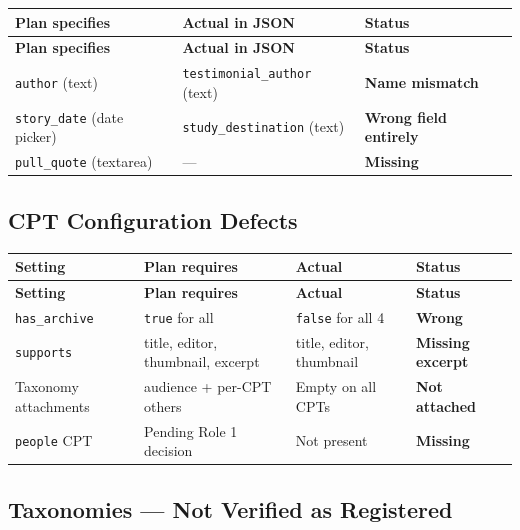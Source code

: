\documentclass[12pt,a4paper]{article}
\begin{document}
\vspace{0.4em}
\begin{longtable}{@{}p{4cm}p{4.2cm}p{4.1cm}@{}}
\toprule
\rowcolor{uvtLightBlue}
\textbf{Plan specifies} & \textbf{Actual in JSON} & \textbf{Status} \\
\midrule
\endfirsthead
\toprule
\rowcolor{uvtLightBlue}
\textbf{Plan specifies} & \textbf{Actual in JSON} & \textbf{Status} \\
\midrule
\endhead
\bottomrule
\endfoot
\texttt{author} (text) & \texttt{testimonial\_author} (text) & \textcolor{statusRed}{\textbf{Name mismatch}} \\
\texttt{story\_date} (date picker) & \texttt{study\_destination} (text) & \textcolor{statusRed}{\textbf{Wrong field entirely}} \\
\texttt{pull\_quote} (textarea) & --- & \textcolor{statusRed}{\textbf{Missing}} \\
\end{longtable}

\subsection{CPT Configuration Defects}

\begin{longtable}{@{}p{3.2cm}p{3.5cm}p{3.5cm}p{2.1cm}@{}}
\toprule
\rowcolor{uvtLightBlue}
\textbf{Setting} & \textbf{Plan requires} & \textbf{Actual} & \textbf{Status} \\
\midrule
\endfirsthead
\toprule
\rowcolor{uvtLightBlue}
\textbf{Setting} & \textbf{Plan requires} & \textbf{Actual} & \textbf{Status} \\
\midrule
\endhead
\bottomrule
\endfoot
\texttt{has\_archive} & \texttt{true} for all & \texttt{false} for all 4 & \textcolor{statusRed}{\textbf{Wrong}} \\
\texttt{supports} & title, editor, thumbnail, excerpt & title, editor, thumbnail & \textcolor{statusRed}{\textbf{Missing excerpt}} \\
Taxonomy attachments & audience + per-CPT others & Empty on all CPTs & \textcolor{statusRed}{\textbf{Not attached}} \\
\texttt{people} CPT & Pending Role 1 decision & Not present & \textcolor{statusRed}{\textbf{Missing}} \\
\end{longtable}

\subsection{Taxonomies --- Not Verified as Registered}
\end{document}
